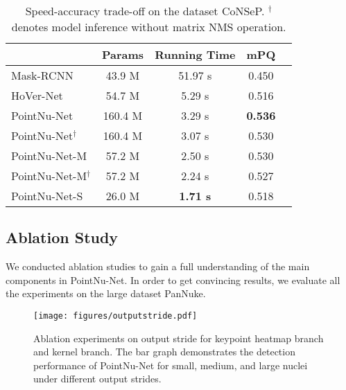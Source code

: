 \documentclass[lettersize,journal]{IEEEtran}
\begin{document}
\begin{table}[]\footnotesize
\centering
\caption{Speed-accuracy trade-off on the dataset CoNSeP.  $^\dagger$ denotes model inference without matrix NMS operation.}
\begin{tabular}{lcccl}
\toprule
 & Params  & Running Time & \multicolumn{1}{c}{mPQ} \\ \midrule
Mask-RCNN & 43.9 M & 51.97 s & 0.450 \\
HoVer-Net & 54.7 M & 5.29 s & 0.516 \\
PointNu-Net & 160.4 M & 3.29 s & \textbf{0.536} \\
PointNu-Net$^\dagger$ & 160.4 M & 3.07 s & 0.530 \\
PointNu-Net-M & 57.2 M & 2.50 s & 0.530 \\
PointNu-Net-M$^\dagger$  & 57.2 M & 2.24 s & 0.527 \\
PointNu-Net-S  & 26.0 M & \textbf{1.71 s} & 0.518 \\ \bottomrule
\end{tabular}
\label{tab:tf}
\end{table}


\subsection{Ablation Study}
We conducted ablation studies to gain a full understanding of the main components in PointNu-Net. In order to get convincing results, we evaluate all the experiments on the large dataset PanNuke.
 
 \begin{figure}[t]
\centering
\texttt{[image: figures/outputstride.pdf]}
\caption{Ablation experiments on output stride for keypoint heatmap branch and kernel branch. The bar graph demonstrates the detection performance of PointNu-Net for small, medium, and large nuclei under different output strides.}
\label{fig:stride}
\end{figure}
\end{document}
